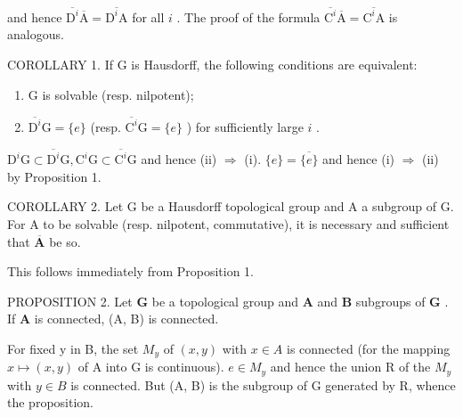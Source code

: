 and hence \(\overline{\mathrm{D}^{i}}\overline{\mathrm{A}} = \overline{\mathrm{D}^{i}\mathrm{A}}\) for all \(i\) . The proof of the formula \(\overline{\mathrm{C}^{i}}\overline{\mathrm{A}} = \overline{\mathrm{C}^{i}\mathrm{A}}\) is analogous.

COROLLARY 1. If G is Hausdorff, the following conditions are equivalent:

\begin{enumerate}
\def\labelenumi{(\roman{enumi})}
\item
  G is solvable (resp. nilpotent);
\item
  \(\overline{\mathrm{D}^{i}}\mathrm{G} = \{e\}\) (resp. \(\overline{\mathrm{C}^{i}}\mathrm{G} = \{e\}\) ) for sufficiently large \(i\) .
\end{enumerate}

\(\mathrm{D}^{i}\mathrm{G} \subset \overline{\mathrm{D}^{i}}\mathrm{G}, \mathrm{C}^{i}\mathrm{G} \subset \overline{\mathrm{C}^{i}}\mathrm{G}\) and hence (ii) \(\Rightarrow\) (i). \(\{e\} = \overline{\{e\}}\) and hence (i) \(\Rightarrow\) (ii) by Proposition 1.

COROLLARY 2. Let G be a Hausdorff topological group and A a subgroup of G. For A to be solvable (resp. nilpotent, commutative), it is necessary and sufficient that \(\overline{\mathbf{A}}\) be so.

This follows immediately from Proposition 1.

PROPOSITION 2. Let \(\mathbf{G}\) be a topological group and \(\mathbf{A}\) and \(\mathbf{B}\) subgroups of \(\mathbf{G}\) . If \(\mathbf{A}\) is connected, (A, B) is connected.

For fixed y in B, the set \(M_{y}\) of \((x,y)\) with \(x \in A\) is connected (for the mapping \(x \mapsto (x,y)\) of A into G is continuous). \(e \in M_{y}\) and hence the union R of the \(M_{y}\) with \(y \in B\) is connected. But (A, B) is the subgroup of G generated by R, whence the proposition.

